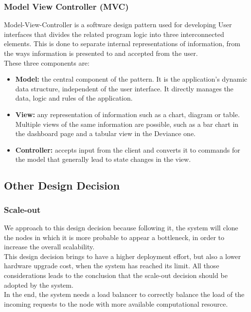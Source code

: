 \subsubsection{Model View Controller (MVC)}
Model-View-Controller is a software design pattern used for developing User interfaces that divides the related program logic into three interconnected elements. This is done to separate internal representations of information, from the ways information is presented to and accepted from the user.\\
These three components are:
\begin{itemize}
    \item \textbf{Model:} the central component of the pattern. It is the application's dynamic data structure, independent of the user interface. It directly manages the data, logic and rules of the application.
    \item  \textbf{View:} any representation of information such as a chart, diagram or table. Multiple views of the same information are possible, such as a bar chart in the dashboard page and a tabular view in the Deviance one.
    \item  \textbf{Controller:} accepts input from the client and converts it to commands for the model that generally lead to state changes in the view.
\end{itemize} 

\subsection{Other Design Decision}

\subsubsection{Scale-out}
\label{section:scale-out}
We approach to this design decision because following it, the system will clone the nodes in which it is more probable to appear a bottleneck, in order to increase the overall scalability.\\
This design decision brings to have a higher deployment effort, but also a lower hardware upgrade cost, when the system has reached its limit. All those considerations leads to the conclusion that the scale-out decision should be adopted by the system.\\
In the end, the system needs a load balancer to correctly balance the load of the incoming requests to the node with more available computational resource.

